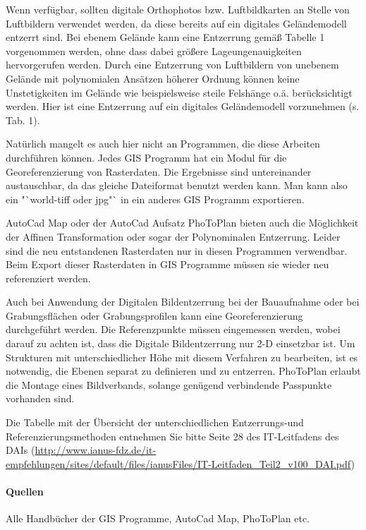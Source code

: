 Wenn verfügbar, sollten digitale Orthophotos bzw. Luftbildkarten an Stelle von Luftbildern verwendet werden, da diese bereits auf ein digitales Geländemodell entzerrt sind. Bei ebenem Gelände kann eine Entzerrung gemäß Tabelle 1 vorgenommen werden, ohne dass dabei größere Lageungenauigkeiten  hervorgerufen werden. Durch eine Entzerrung von Luftbildern von unebenem Gelände mit polynomialen Ansätzen höherer Ordnung können keine Unstetigkeiten im Gelände wie beispielsweise steile Felshänge o.ä. berücksichtigt werden. Hier ist eine Entzerrung auf ein digitales Geländemodell vorzunehmen (s. Tab. 1).

Natürlich mangelt es auch hier nicht an Programmen, die diese Arbeiten durchführen können. Jedes GIS Programm hat ein Modul für die Georeferenzierung von Rasterdaten. Die Ergebnisse sind untereinander austauschbar, da das gleiche Dateiformat benutzt werden kann. Man kann also ein "`world-tiff oder jpg"` in ein anderes GIS Programm exportieren. 

AutoCad Map oder der AutoCad Aufsatz PhoToPlan bieten auch die Möglichkeit der Affinen Transformation oder sogar der Polynominalen Entzerrung. Leider sind die neu entstandenen Rasterdaten nur in diesen Programmen verwendbar. Beim Export dieser Rasterdaten in GIS Programme müssen sie wieder neu referenziert werden.

Auch bei Anwendung der Digitalen Bildentzerrung bei der Bauaufnahme oder bei Grabungsflächen oder Grabungsprofilen kann eine Georeferenzierung durchgeführt werden. Die Referenzpunkte müssen eingemessen werden, wobei darauf zu achten ist, dass die Digitale Bildentzerrung nur 2-D einsetzbar ist. Um Strukturen mit unterschiedlicher Höhe mit diesem Verfahren zu bearbeiten, ist es notwendig, die Ebenen separat zu definieren und zu entzerren. PhoToPlan erlaubt die Montage eines Bildverbands, solange genügend verbindende Passpunkte vorhanden sind.


Die Tabelle mit der Übersicht der unterschiedlichen Entzerrungs-und Referenzierungsmethoden entnehmen Sie bitte Seite 28 des IT-Leitfadens des DAIs (\url{http://www.ianus-fdz.de/it-empfehlungen/sites/default/files/ianusFiles/IT-Leitfaden_Teil2_v100_DAI.pdf})


\paragraph{Quellen}
\begin{flushleft}
Alle Handbücher der GIS Programme, AutoCad Map, PhoToPlan etc. 
\end{flushleft}